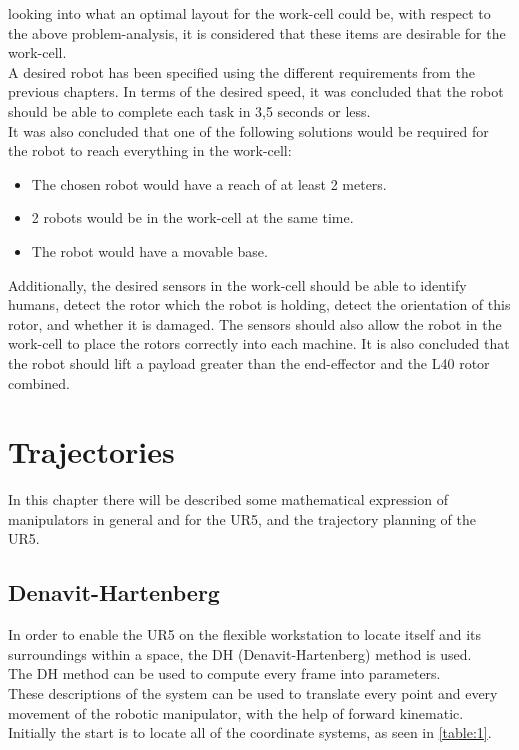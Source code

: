 looking into what an optimal layout for the work-cell could be, with respect to the above problem-analysis, it is considered that these items are desirable for the work-cell.\\
A desired robot has been specified using the different requirements from the previous chapters. In terms of the desired speed, it was concluded that the robot should be able to complete each task in 3,5 seconds or less.\\
It was also concluded that one of the following solutions would be required for the robot to reach everything in the work-cell: 
\begin{itemize}
    \item The chosen robot would have a reach of at least 2 meters.
    \item 2 robots would be in the work-cell at the same time. 
    \item The robot would have a movable base. 
\end{itemize} 
Additionally, the desired sensors in the work-cell should be able to identify humans, detect the rotor which the robot is holding, detect the orientation of this rotor, and whether it is damaged. The sensors should also allow the robot in the work-cell to place the rotors correctly into each machine. It is also concluded that the robot should lift a payload greater than the end-effector and the L40 rotor combined.\\

\chapter{Trajectories}\label{ch:kinematics}

In this chapter there will be described some mathematical expression of manipulators in general and for the UR5, and the trajectory planning of the UR5.

\section{Denavit-Hartenberg}

In order to enable the UR5 on the flexible workstation to locate itself and its surroundings within a space, the DH (Denavit-Hartenberg) method is used.\\ 
The DH method can be used to compute every frame into parameters.\\
These descriptions of the system can be used to translate every point and every movement of the robotic manipulator, with the help of forward kinematic.\\
Initially the start is to locate all of the coordinate systems, as seen in \ref{table:1}.\\ 

